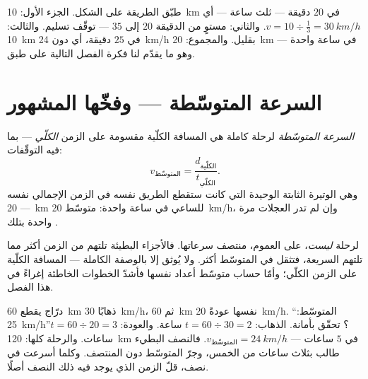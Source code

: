 \begin{example}\label{ex:g7:motion-average-speed:decoded}
طبّق الطريقة على الشكل. الجزء الأول: \qty{10}{km} في $20$
دقيقة --- ثلث ساعة --- أي $v = 10 \div \tfrac{1}{3} =
\qty{30}{km/h}$. والثاني: مستوٍ من الدقيقة $20$ إلى $35$ ---
توقّف تسليم. والثالث: \qty{10}{km} في $25$ دقيقة، أي دون
\qty{24}{km/h} بقليل. والمجموع: \qty{20}{km} في ساعة واحدة ---
وهو ما يقدّم لنا فكرة الفصل التالية على طبق.
\end{example}

\section{السرعة المتوسّطة --- وفخّها المشهور}

\begin{definition}\label{def:g7:motion-average-speed:average}
\emph{السرعة المتوسّطة} لرحلة كاملة هي
المسافة الكلّية مقسومة على الزمن \emph{الكلّي} --- بما فيه
التوقّفات:
\[
v_{\text{المتوسّط}} = \frac{d_{\text{الكلّية}}}{t_{\text{الكلّي}}}.
\]
وهي الوتيرة الثابتة الوحيدة التي كانت ستقطع الطريق نفسه في
الزمن الإجمالي نفسه --- \qty{20}{km} للساعي في ساعة واحدة:
متوسّط \qty{20}{km/h}، وإن لم تدر العجلات مرة واحدة بتلك
.
\end{definition}

\begin{proposition}[الفخّ]\label{prop:g7:motion-average-speed:trap}
 لرحلة \emph{ليست}، على العموم، منتصف سرعاتها.
فالأجزاء البطيئة تلتهم من الزمن أكثر مما تلتهم السريعة، فتثقل
في المتوسّط أكثر. ولا يُوثق إلا بالوصفة الكاملة --- المسافة
الكلّية على الزمن الكلّي؛ وأمّا حساب متوسّط أعداد  نفسها
فأشدّ الخطوات الخاطئة إغراءً في هذا الفصل.
\end{proposition}

\begin{example}\label{ex:g7:motion-average-speed:sprung}
درّاج يقطع \qty{60}{km} ذهابًا  \qty{30}{km/h}، ثم
\qty{60}{km} نفسها عودةً  \qty{20}{km/h}. ``المتوسّط:
\qty{25}{km/h}''؟ تحقّق بأمانة. الذهاب: $t = 60 \div 30 = 2$
ساعة. والعودة: $t = 60 \div 20 = 3$ ساعات. والرحلة كلها:
\qty{120}{km} في $5$ ساعات ---
$v_{\text{المتوسّط}} = \qty{24}{km/h}$. فالنصف البطيء طالب بثلاث
ساعات من الخمس، وجرّ المتوسّط دون المنتصف. وكلما أسرعت في نصف،
قلّ الزمن الذي يوجد فيه ذلك النصف أصلًا.
\end{example}

